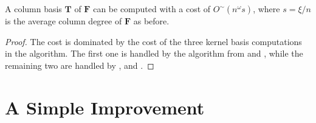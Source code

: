  
\begin{thm}
\label{thm:columnBasisCost1}A column basis $\mathbf{T}$ of $\mathbf{F}$
can be computed with a cost of $O^{\sim}\left(n^{\omega}s\right)$,
where $s=\xi/n$ is the average column degree of $\mathbf{F}$ as
before. \end{thm}
\begin{proof}
The cost is dominated by the cost of the three kernel basis computations
in the algorithm. The first one is handled by the algorithm from \citet{za2012}
and , while the remaining two are handled
by , 
and .
\end{proof}
\begin{comment}
This can be done by computing a left $\left[0,\dots,0,d,\dots,d\right]$-minimal
kernel basis $\left[\mathbf{T}',V\right]$ of $\left[\mathbf{G}^{T},\mathbf{F}^{T}\right]^{T}$,
where $d$ is the degree of $\mathbf{F},$ $V$ is a unimodular matrix
and $\mathbf{T}'$ is a $m\times m$ matrix. Note that $\left[\mathbf{T}',V\right]$
has $m$ rows since the rank of $\left[\mathbf{G}^{T},\mathbf{F}^{T}\right]^{T}$
is $m$. Also note that since $\left[\mathbf{T},I\right]$ is a left
kernel basis with $\left[0,\dots,0,d,\dots,d\right]$-row degrees
bounded by $d$, the $\left[0,\dots,0,d,\dots,d\right]$-minimal kernel
basis $\left[\mathbf{T}',V\right]$ must also has its $\left[0,\dots,0,d,\dots,d\right]$-row
degrees bounded by $d$, hence the degree of $V$ must be 0. We can
then easily compute $\mathbf{T}=\mathbf{T}'V^{-1}$. 
\end{comment}



\section{\label{sec:successiveColBasisComputation}A Simple Improvement}

